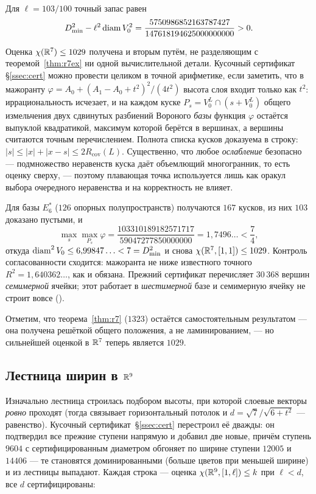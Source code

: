 Для $\ell=103/100$ точный запас равен
\[
D_{\min}^2-\ell^2\operatorname{diam} V_0^2
=\frac{5750986852163787427}{147618194625000000000}>0 .
\]

\begin{remark}\label{rem:r7second}
Оценка $\chi(\mathbb{R}^7)\le1029$ получена и вторым путём, не разделяющим с
теоремой~\ref{thm:r7ex} ни одной вычислительной детали. Кусочный сертификат
\S\ref{ssec:cert} можно провести целиком в точной арифметике, если заметить,
что в мажоранту
$\varphi=A_0+(A_1-A_0+t^2)^2/(4t^2)$ высота слоя входит только как $t^2$:
иррациональность исчезает, и на каждом куске
$P_s=V_0^{L}\cap(s+V_0^{L})$ общего измельчения двух сдвинутых разбиений
Вороного \emph{базы} функция $\varphi$ остаётся выпуклой квадратикой, максимум
которой берётся в вершинах, а вершины считаются точным перечислением. Полнота
списка кусков доказуема в строку: $|s|\le|x|+|x-s|\le2R_{\mathrm{cov}}(L)$.
Существенно, что любое \emph{ослабление} безопасно --- подмножество неравенств
куска даёт объемлющий многогранник, то есть оценку сверху, --- поэтому
плавающая точка используется лишь как оракул выбора очередного неравенства и на
корректность не влияет.

Для базы $E_6^*$ ($126$ опорных полупространств) получаются $167$ кусков, из них
$103$ доказано пустыми, и
\[
\max_s\max_{P_s}\varphi=\frac{103310189182571717}{59047277850000000}
=1{,}7496\ldots<\frac74,
\]
откуда $\operatorname{diam}^2V_0\le6{,}99847\ldots<7=D_{\min}^2$ и снова
$\chi(\mathbb{R}^7,[1,1])\le1029$. Контроль согласованности сходится: мажоранта не ниже
известного точного $R^2=1{,}640362\ldots$, как и обязана. Прежний сертификат
перечисляет $30\,368$ вершин \emph{семимерной} ячейки; этот работает в
\emph{шестимерной} базе и семимерную ячейку не строит вовсе
().
\end{remark}
Отметим, что теорема~\ref{thm:r7} ($1323$) остаётся самостоятельным
результатом --- она получена решёткой общего положения, а не ламинированием, ---
но сильнейшей оценкой в $\mathbb{R}^7$ теперь является $1029$.

\subsection{Лестница ширин в $\mathbb{R}^9$}\label{ssec:stair9}

Изначально лестница строилась подбором высоты, при которой слоевые векторы
\emph{ровно} проходят (тогда связывает горизонтальный потолок и
$d=\sqrt7/\sqrt{6+t^2}$ --- равенство). Кусочный сертификат~\S\ref{ssec:cert}
перестроил её дважды: он подтвердил все прежние ступени напрямую и добавил две
новые, причём ступень $9604$ с сертифицированным диаметром обгоняет по ширине
ступени $12005$ и $14406$ --- те становятся доминированными (больше цветов при
меньшей ширине) и из лестницы выпадают. Каждая строка --- оценка
$\chi(\mathbb{R}^9,[1,\ell])\le k$ при $\ell<d$, все $d$ сертифицированы:

